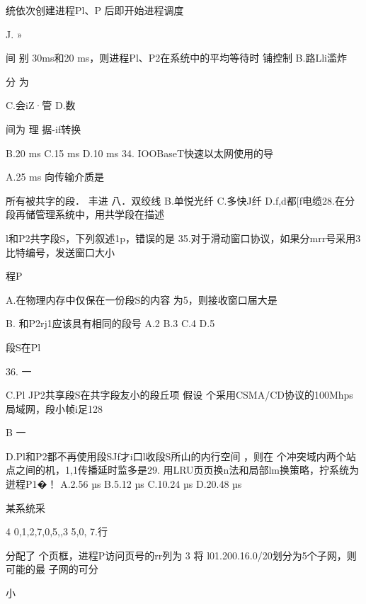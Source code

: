    统依次创建进程Pl、P 后即开始进程调度

    J. »

   间  别   30ms和20 ms，则进程Pl、P2在系统中的平均等待时    铺控制    B.路Lli滥炸

    分  为

    C.会iZ·管    D.数

   间为    理    据-if转换

    B.20 ms    C.15 ms    D.10 ms    34. IOOBaseT快速以太网使用的导

   A.25 ms    向传输介质是

    所有被共字的段． 丰进    八．双绞线    B.单悦光纤    C.多快J纤   D.f,d都[f电缆28.在分段再储管理系统中，用共学段在描述

    l和P2共字段S，下列叙述1p，错误的是    35.对于滑动窗口协议，如果分mrr号采用3 比特编号，发送窗口大小

   程P

   A.在物理内存中仅保在一份段S的内容    为5，则接收窗口届大是

   B.    和P2rj1应该具有相同的段号    A.2    B.3    C.4    D.5

    段S在Pl

    36.    一

   C.Pl JP2共享段S在共字段友小的段丘项    假设  个采用CSMA/CD协议的100Mhps局域网，段小帧i足128

    B    一

   D.Pl和P2都不再使用段SJf才i口l收段S所山的内行空间    ，则在  个冲突域内两个站点之间的机，1,1传播延时监多是29.    用LRU页页换n法和局部lm换策略，拧系统为迸程P1�！    A.2.56 µs    B.5.12 µs    C.10.24 µs   D.20.48 µs

   某系统采

    4    0,1,2,7,0,5,,3 5,0,    7.行

   分配了  个页框，进程P访问页号的rr列为    3    将 l01.200.16.0/20划分为5个子网，则可能的最  子网的可分

    小


